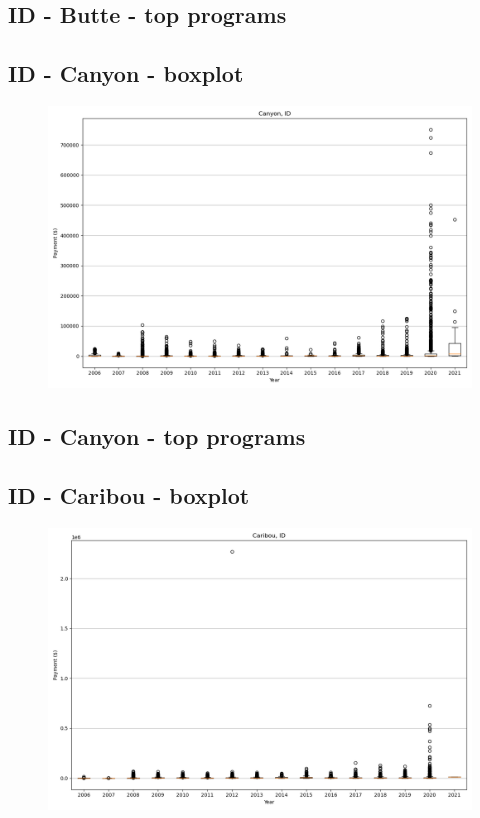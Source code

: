 \subsection*{ID - Butte - top programs}

\newpage
\subsection*{ID - Canyon - boxplot}
\begin{figure}[h]
\centering
\includegraphics[width=7in]{../output/boxplots/counties/Canyon-ID_boxplot.png}
\end{figure}


\subsection*{ID - Canyon - top programs}

\newpage
\subsection*{ID - Caribou - boxplot}
\begin{figure}[h]
\centering
\includegraphics[width=7in]{../output/boxplots/counties/Caribou-ID_boxplot.png}
\end{figure}


